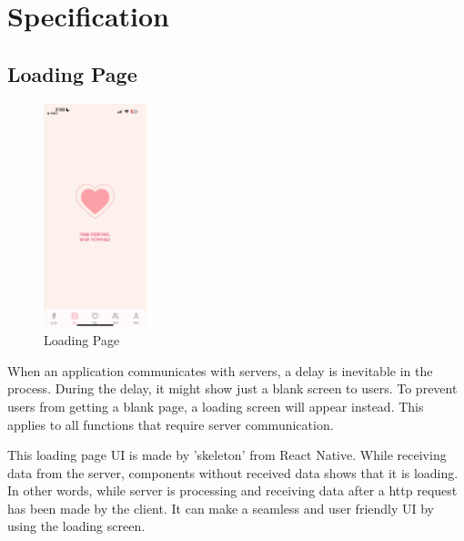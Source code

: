 \documentclass[conference]{IEEEtran}
\begin{document}
    \section{Specification}
   \subsection{Loading Page}
        \begin{figure}[htbp]
            \centerline{\includegraphics[width=3cm]{Images/page/loading.png}}
            \caption{Loading Page}
            \label{fig}
        \end{figure}
        When an application communicates with servers, a delay is inevitable in the process. During the delay, it might show just a blank screen to users. To prevent users from getting a blank page, a loading screen will appear instead. This applies to all functions that require server communication.

        This loading page UI is made by 'skeleton' from React Native. While receiving data from the server, components without received data shows that it is loading. In other words, while server is processing and receiving data after a http request has been made by the client. It can make a seamless and user friendly UI by using the loading screen. 
        
\end{document}
